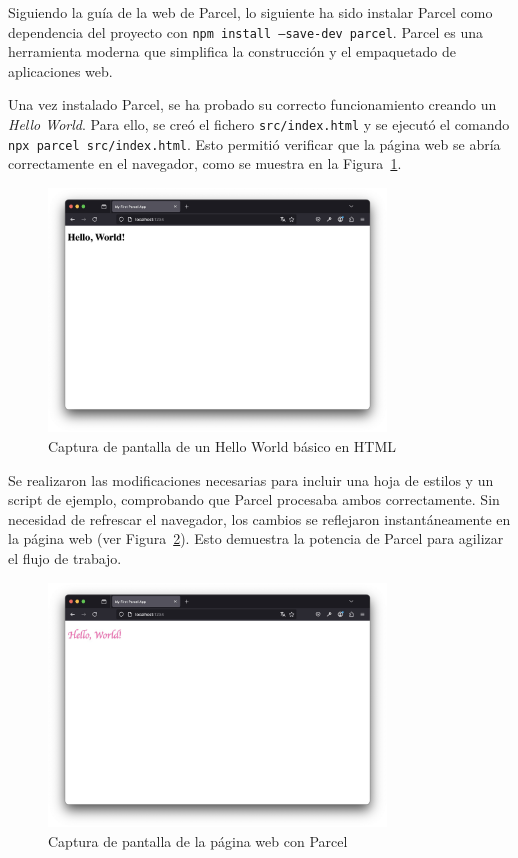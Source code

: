 \documentclass{article}
\begin{document}
Siguiendo la guía de la web de Parcel, lo siguiente ha sido instalar Parcel como dependencia del proyecto con \texttt{npm install --save-dev parcel}. Parcel es una herramienta moderna que simplifica la construcción y el empaquetado de aplicaciones web.

Una vez instalado Parcel, se ha probado su correcto funcionamiento creando un \textit{Hello World}. Para ello, se creó el fichero \texttt{src/index.html} y se ejecutó el comando \texttt{npx parcel src/index.html}. Esto permitió verificar que la página web se abría correctamente en el navegador, como se muestra en la Figura~\ref{fig:hello-world}.

 \begin{figure}[h!]
     \centering
     \includegraphics[width=0.8\textwidth]{./img/p1/hello-world}
     \caption{Captura de pantalla de un Hello World básico en HTML}
     \label{fig:hello-world}
 \end{figure}

Se realizaron las modificaciones necesarias para incluir una hoja de estilos y un script de ejemplo, comprobando que Parcel procesaba ambos correctamente. Sin necesidad de refrescar el navegador, los cambios se reflejaron instantáneamente en la página web (ver Figura~\ref{fig:parcel}). Esto demuestra la potencia de Parcel para agilizar el flujo de trabajo.

 \begin{figure}[h!]
     \centering
     \includegraphics[width=0.8\textwidth]{./img/p1/hello-world-styled}
     \caption{Captura de pantalla de la página web con Parcel}
     \label{fig:parcel}
 \end{figure}
\end{document}
